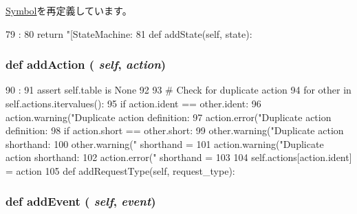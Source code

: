 \hyperlink{classslicc_1_1symbols_1_1Symbol_1_1Symbol_ad8b9328939df072e4740cd9a63189744}{Symbol}を再定義しています。


\begin{DoxyCode}
79                       :
80         return "[StateMachine: %
81 
    def addState(self, state):
\end{DoxyCode}
\hypertarget{classslicc_1_1symbols_1_1StateMachine_1_1StateMachine_ae8ace979fedd5039fbbcd455d89e4f16}{
\subsubsection[{addAction}]{\setlength{\rightskip}{0pt plus 5cm}def addAction ( {\em self}, \/   {\em action})}}
\label{classslicc_1_1symbols_1_1StateMachine_1_1StateMachine_ae8ace979fedd5039fbbcd455d89e4f16}



\begin{DoxyCode}
90                                :
91         assert self.table is None
92 
93         # Check for duplicate action
94         for other in self.actions.itervalues():
95             if action.ident == other.ident:
96                 action.warning("Duplicate action definition: %
97                 action.error("Duplicate action definition: %
98             if action.short == other.short:
99                 other.warning("Duplicate action shorthand: %
100                 other.warning("    shorthand = %
101                 action.warning("Duplicate action shorthand: %
102                 action.error("    shorthand = %
103 
104         self.actions[action.ident] = action
105 
    def addRequestType(self, request_type):
\end{DoxyCode}
\hypertarget{classslicc_1_1symbols_1_1StateMachine_1_1StateMachine_a1ac9aa52837502937e5ee3e0ce890a62}{
\subsubsection[{addEvent}]{\setlength{\rightskip}{0pt plus 5cm}def addEvent ( {\em self}, \/   {\em event})}}
\label{classslicc_1_1symbols_1_1StateMachine_1_1StateMachine_a1ac9aa52837502937e5ee3e0ce890a62}



